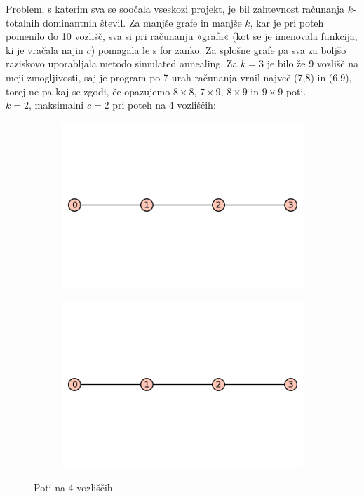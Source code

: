 \documentclass[12pt, a4paper]{article}
\begin{document}
Problem, s katerim sva se soočala vseskozi projekt, je bil zahtevnost računanja $k$-totalnih dominantnih števil. Za manjše grafe in manjše $k$, kar je pri poteh pomenilo do 10 vozlišč, sva si pri računanju »grafa« (kot se je imenovala funkcija, ki je vračala najin $c$) pomagala le s for zanko. Za splošne grafe pa sva za boljšo raziskovo uporabljala metodo simulated annealing. Za $k=3$ je bilo že 9 vozlišč na meji zmogljivosti, saj je program po 7 urah računanja vrnil največ (7,8) in (6,9), torej ne pa kaj se zgodi, če opazujemo $8\times8$, $7\times9$, $8\times9$ in $9\times9$ poti. \\
\clearpage
$k=2$, maksimalni $c=2$ pri poteh na 4 vozliščih:
\begin{figure}[!htb]
\centering
\begin{subfigure}{0.5\textwidth}
  \centering
  \includegraphics[width=0.5\linewidth]{4-pot}
\end{subfigure}%
\begin{subfigure}{0.5\textwidth}
  \centering
  \includegraphics[width=0.5\linewidth]{4-pot}
\end{subfigure}
\caption{Poti na 4 vozliščih}
\label{fig:test}
\end{figure}
\end{document}
